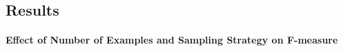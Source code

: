 
\subsection{Results}
\paragraph{Effect of Number of Examples and Sampling Strategy on F-measure}


